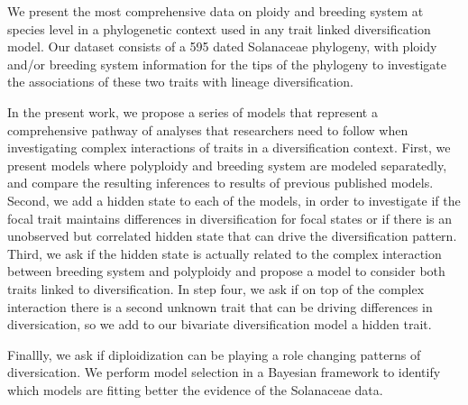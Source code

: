 We present the most comprehensive data on ploidy and breeding system at species level in a phylogenetic context used in any trait linked diversification model. Our dataset consists of  a 595 dated Solanaceae phylogeny, with ploidy and/or breeding system information for the tips of the phylogeny to investigate the associations of these two traits with lineage diversification.

In the present work, we propose a series of models that represent a comprehensive pathway of analyses that researchers need to follow when investigating complex interactions of traits in a diversification context. First, we present models where polyploidy and breeding system are modeled separatedly, and compare the resulting inferences to results of previous published models. Second, we add a hidden state to each of the models, in order to investigate if the focal trait maintains differences in diversification for focal states or if there is an unobserved but correlated hidden state that can drive the diversification pattern. Third, we ask if the hidden state is actually related to the complex interaction between breeding system and polyploidy and propose a model to consider both traits linked to diversification. In step four, we  ask if on top of the complex interaction there is a second unknown trait that can be driving differences in diversication, so we add to our bivariate diversification model a hidden trait.\newline

Finallly, we ask if diploidization can be playing a role changing patterns of diversication. We perform model selection in a Bayesian framework to identify which models are fitting better the evidence of the Solanaceae data.







